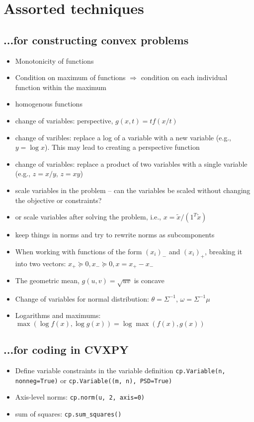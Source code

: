 \documentclass{article}
\begin{document}
\section{Assorted techniques}
\subsection{...for constructing convex problems}
\begin{itemize}
  \item Monotonicity of functions
  \item Condition on maximum of functions $\Longrightarrow$ condition on each individual function within the maximum
  \item homogenous functions
  \item change of variables: perspective, $g(x, t) = tf(x/t)$
  \item change of varibles: replace a log of a variable with a new variable (e.g., $y = \log x$). This may lead to creating a perspective function
  \item change of variables: replace a product of two variables with a single variable (e.g., $z = x/y$, $z = xy$)
  \item scale variables in the problem -- can the variables be scaled without changing the objective or constraints?
  \item or scale variables after solving the problem, i.e., $x = \tilde{x} / (1^T\tilde{x})$
  \item keep things in norms and try to rewrite norms as subcomponents
  \item When working with functions of the form $(x_i)_-$ and $(x_i)_+$, breaking it into two vectors: $x_+ \succeq 0, x_- \succeq 0, x = x_+ - x_-$
  \item The geometric mean, $g(u,v) = \sqrt{uv}$ is concave
  \item Change of variables for normal distribution: $\theta = \Sigma^{-1}$, $\omega = \Sigma^{-1}\mu$
  \item Logarithms and maximums: $\max(\log f(x), \log g(x)) = \log\max(f(x), g(x))$
\end{itemize}
\subsection{...for coding in CVXPY}
\begin{itemize}
  \item Define variable constraints in the variable definition \verb|cp.Variable(n, nonneg=True)| or \verb|cp.Variable((m, n), PSD=True)|
  \item Axis-level norms: \verb|cp.norm(u, 2, axis=0)|
  \item sum of squares: \verb|cp.sum_squares()|
\end{itemize}
\end{document}
